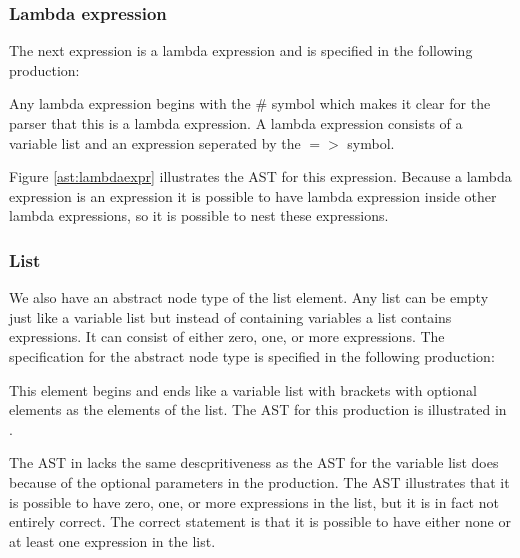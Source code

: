 %

\subsubsection{Lambda expression}%

The next expression is a lambda expression and is specified in the following production:%

\begin{ebnf}%
%
\end{ebnf}%

Any lambda expression begins with the \# symbol which makes it clear for the parser that this is a lambda expression. A lambda expression consists of a variable list and an expression seperated by the $=>$ symbol.%

%

Figure \ref{ast:lambdaexpr} illustrates the AST for this expression. Because a lambda expression is an expression it is possible to have lambda expression inside other lambda expressions, so it is possible to nest these expressions.%

\subsubsection{List}%

We also have an abstract node type of the list element. Any list can be empty just like a variable list but instead of containing variables a list contains expressions. It can consist of either zero, one, or more expressions. The specification for the abstract node type is specified in the following production:%

\begin{ebnf}%
%
\end{ebnf}%

This element begins and ends like a variable list with brackets with optional elements as the elements of the list. The AST for this production is illustrated in .%

%

The AST in  lacks the same descpritiveness as the AST for the variable list does because of the optional parameters in the production. The AST illustrates that it is possible to have zero, one, or more expressions in the list, but it is in fact not entirely correct. The correct statement is that it is possible to have either none or at least one expression in the list.%

